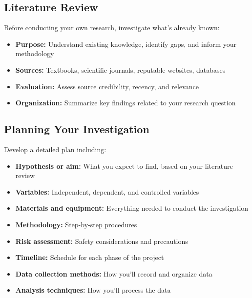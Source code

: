     \centering

\subsection{Literature Review}

Before conducting your own research, investigate what's already known:
\begin{itemize}
    \item \textbf{Purpose:} Understand existing knowledge, identify gaps, and inform your methodology
    \item \textbf{Sources:} Textbooks, scientific journals, reputable websites, databases
    \item \textbf{Evaluation:} Assess source credibility, recency, and relevance
    \item \textbf{Organization:} Summarize key findings related to your research question
\end{itemize}


\subsection{Planning Your Investigation}

Develop a detailed plan including:
\begin{itemize}
    \item \textbf{Hypothesis or aim:} What you expect to find, based on your literature review
    \item \textbf{Variables:} Independent, dependent, and controlled variables
    \item \textbf{Materials and equipment:} Everything needed to conduct the investigation
    \item \textbf{Methodology:} Step-by-step procedures
    \item \textbf{Risk assessment:} Safety considerations and precautions
    \item \textbf{Timeline:} Schedule for each phase of the project
    \item \textbf{Data collection methods:} How you'll record and organize data
    \item \textbf{Analysis techniques:} How you'll process the data
\end{itemize}

